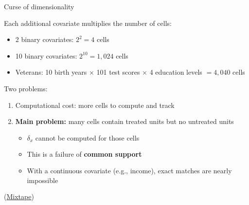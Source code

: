 \documentclass[compress, 8pt]{beamer}
\begin{document}
\begin{frame}{Curse of dimensionality}

Each additional covariate multiplies the number of cells:
\begin{itemize}
    \item 2 binary covariates: $2^2 = 4$ cells
    \item 10 binary covariates: $2^{10} = 1{,}024$ cells
    \item Veterans: 10 birth years $\times$ 101 test scores $\times$ 4 education levels $= 4{,}040$ cells
\end{itemize}

\vspace{2ex}
Two problems:
\begin{enumerate}
    \item Computational cost: more cells to compute and track
    \item \textbf{Main problem:} many cells contain treated units but no untreated units
    \begin{itemize}
        \item $\delta_x$ cannot be computed for those cells
        \item This is a failure of \textbf{common support}
        \item With a continuous covariate (e.g., income), exact matches are nearly impossible
    \end{itemize}
\end{enumerate}
(\href{https://mixtape.scunning.com/05-causal_cross_sectional_designs\#curse-of-dimensionality}{Mixtape})

\end{frame}
\end{document}
